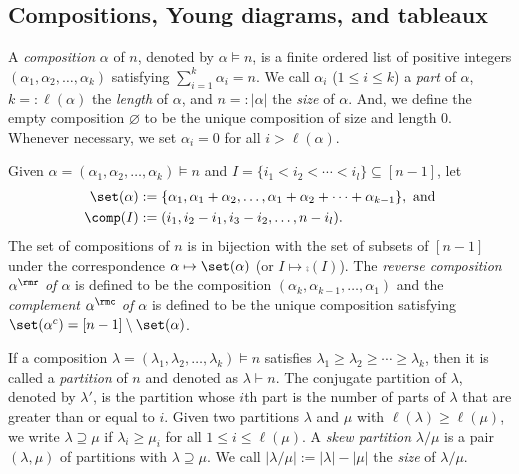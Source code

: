 \documentclass[12pt, reqno]{amsart}
\theoremstyle{plain}
\theoremstyle{definition}
\numberwithin{equation}{section}
\numberwithin{figure}{section}
\numberwithin{table}{section}
\begin{document}
\subsection{Compositions, Young diagrams, and  tableaux}\label{subsec: comp and diag}
A \emph{composition} $\alpha$ of $n$, denoted by $\alpha \models n$, is a finite ordered list of positive integers $(\alpha_1,\alpha_2,\ldots, \alpha_k)$ satisfying $\sum_{i=1}^k \alpha_i = n$.
We call $\alpha_i$ ($1 \le i \le k$) a \emph{part} of $\alpha$, $k =: \ell(\alpha)$ the \emph{length} of $\alpha$, and $n =:|\alpha|$ the \emph{size} of $\alpha$. 
And, we define the empty composition $\varnothing$ to be the unique composition of size and length $0$.
Whenever necessary, we set $\alpha_i = 0$ for all $i > \ell(\alpha)$.



Given $\alpha = (\alpha_1,\alpha_2,\ldots,\alpha_k) \models n$ and $I = \{i_1 < i_2 < \cdots < i_{l}\} \subseteq [n-1]$, 
let 
\begin{align*}
    \set(\alpha) &:= \{\alpha_1,\alpha_1+\alpha_2,\ldots, \alpha_1 + \alpha_2 + \cdots + \alpha_{k-1}\}, \text{ and} \\\comp(I) &:= (i_1,i_2 - i_1, i_3 - i_2, \ldots,n-i_{l}).
\end{align*}
The set of compositions of $n$ is in bijection with the set of subsets of $[n-1]$ under the correspondence $\alpha \mapsto \set(\alpha)$ (or $I \mapsto \comp(I)$).
The \emph{reverse composition $\alpha^\rmr$ of $\alpha$} is defined to be the composition $(\alpha_k, \alpha_{k-1}, \ldots, \alpha_1)$ and
the \emph{complement $\alpha^\rmc$ of $\alpha$} is defined to be the unique composition satisfying $\set(\alpha^c) = [n-1] \setminus \set(\alpha)$.


If a composition $\lambda = (\lambda_1, \lambda_2, \ldots, \lambda_k) \models n$ satisfies $\lambda_1 \ge \lambda_2 \ge \cdots \ge \lambda_k$, then it is called a \emph{partition} of $n$ and denoted as $\lambda \vdash n$.
The conjugate partition of $\lambda$, denoted by $\lambda'$, is the partition whose $i$th part is the number of parts of $\lambda$ that are greater than or equal to $i$.
Given two partitions $\lambda$ and $\mu$ with $\ell(\lambda) \ge \ell(\mu)$, we write $\lambda \supseteq \mu$ if $\lambda_i \geq  \mu_i$ for all $1 \le i \le \ell(\mu)$. 
A \emph{skew partition} $\lambda/\mu$ is a pair  $(\lambda, \mu)$ of partitions with $\lambda \supseteq \mu$.
We call $|\lambda/\mu| := |\lambda| - |\mu|$ the \emph{size} of $\lambda/\mu$.
\end{document}
